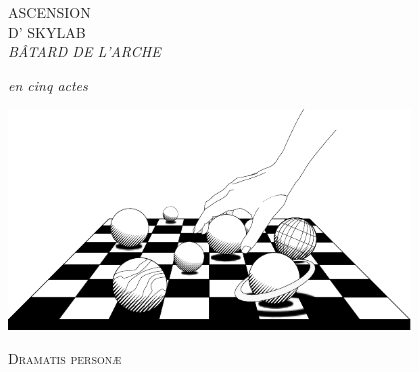 \documentclass[a4paper,12pt,twoside,french]{book}
\begin{document}
  \begin{titlepage}
    \begin{center}

      \vspace*{0.5cm}
      {
        \MakeUppercase{
          \LARGE
          Ascension\\
          d’\elena{} skylab\rlap{,}\\
          {\em{}bâtard de l’Arche}
        }
      }


      {\large{}\em{}en cinq actes}

      \vspace*{-0.5cm}

      \includegraphics[width=0.8\textwidth]{frontispice-echiquier-celeste.pdf}

      \vspace*{0.5cm}

      \begin{adjustwidth}{3.5cm}{3.5cm}
        \begin{center}
        \textsc{Dramatis personæ}
        \end{center}
        \footnotesize
   
        \setlength{\columnseprule}{0.5pt}
        \setlength{\CharWidth}{1.6cm}
        \begin{multicols}{2}
          \dodramperlist{}
        \end{multicols}


\end{adjustwidth}
\end{center}
\end{titlepage}
\end{document}
